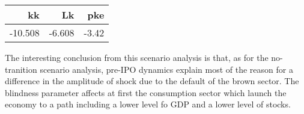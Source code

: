 \documentclass[]{article}
\begin{document}
\begin{longtable}[]{@{}rrr@{}}
\toprule
kk & Lk & pke\tabularnewline
\midrule
\endhead
-10.508 & -6.608 & -3.42\tabularnewline
\bottomrule
\end{longtable}

The interesting conclusion from this scenario analysis is that, as for
the no-tranition scenario analysis, pre-IPO dynamics explain most of the
reason for a difference in the amplitude of shock due to the default of
the brown sector. The blindness parameter affects at first the
consumption sector which launch the economy to a path including a lower
level fo GDP and a lower level of stocks.
\end{document}
